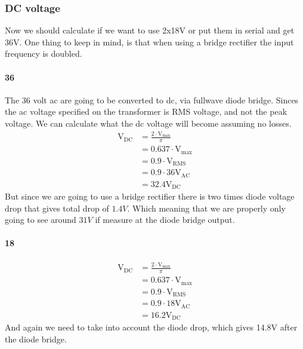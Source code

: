 \subsubsection{DC voltage}
Now we should calculate if we want to use 2x18V or put them in serial and get 36V. 
One thing to keep in mind, is that when using a bridge rectifier the input frequency is doubled.
\paragraph{36 \vac}
The 36 volt ac are going to be converted to dc, via fullwave diode bridge. 
Sinces the ac voltage specified on the transformer is RMS voltage, and not the peak voltage. 
We can calculate what the dc voltage will become assuming no losses.
\begin{align} \label{eq:calc_vdc}
\text{V}_{ \text{DC} } &= \frac{ 2 \cdot \text{V}_{ \text{max} } }{ \pi } \\
         &= 0.637 \cdot \text{V}_{ \text{max} } \\
         &= 0.9 \cdot \text{V}_{ \text{RMS} } \\
         &= 0.9 \cdot 36 \text{V}_{\text{AC}}\nonumber \\
         &= 32.4 \text{V}_{ \text{DC} } \nonumber
\end{align}
But since we are going to use a bridge rectifier there is two times diode voltage drop that gives total drop of \(1.4V\). 
Which meaning that we are properly only going to see around \( 31V \) if measure at the diode bridge output. 
\paragraph{18 \vac}
\begin{align} \label{eq:calc_18vdc}
    \text{V}_{ \text{DC} }  &= \frac{ 2 \cdot \text{V}_{ \text{max} } }{ \pi } \\
             &= 0.637 \cdot \text{V}_{ \text{max} } \\
             &= 0.9 \cdot \text{V}_{ \text{RMS} } \\
             &= 0.9 \cdot 18 \text{V}_{ \text{AC} } \nonumber \\
             &= 16.2 \text{V}_{ \text{DC} } \nonumber
\end{align}
And again we need to take into account the diode drop, which gives 14.8V after the diode bridge.

